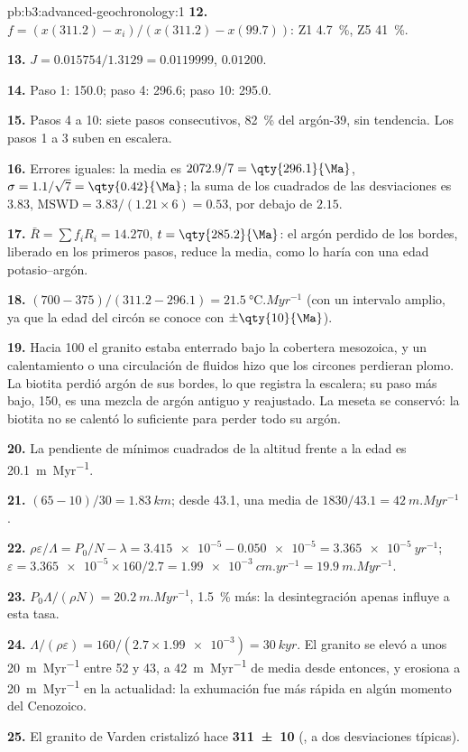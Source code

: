 \begin{solution}{pb:b3:advanced-geochronology:1}
\textbf{12.} $f = (x(311.2) - x_i)/(x(311.2) - x(99.7))$: Z1 \qty{4.7}{\percent},
Z5 \qty{41}{\percent}.

\textbf{13.} $J = 0.015754/1.3129 = 0.0119999$, $0.01200$.

\textbf{14.} Paso 1: \qty{150.0}{\Ma}; paso 4: \qty{296.6}{\Ma}; paso 10:
\qty{295.0}{\Ma}.

\textbf{15.} Pasos 4 a 10: siete pasos consecutivos, \qty{82}{\percent} del
argón-39, sin tendencia. Los pasos 1 a 3 suben en escalera.

\textbf{16.} Errores iguales: la media es $2072.9/7 = \qty{296.1}{\Ma}$, $\sigma =
1.1/\sqrt7 = \qty{0.42}{\Ma}$; la suma de los cuadrados de las desviaciones es $3.83$,
$\mathrm{MSWD} = 3.83/(1.21\times6) = 0.53$, por debajo de $2.15$.

\textbf{17.} $\bar R = \sum f_iR_i = 14.270$, $t = \qty{285.2}{\Ma}$: el
argón perdido de los bordes, liberado en los primeros pasos, reduce la media, como
lo haría con una edad potasio--argón.

\textbf{18.} $(700 - 375)/(311.2 - 296.1) = \qty{21.5}{\celsius.Myr^{-1}}$
(con un intervalo amplio, ya que la edad del circón se conoce con $\pm\qty{10}{\Ma}$).

\textbf{19.} Hacia \qty{100}{\Ma} el granito estaba enterrado bajo la
cobertera mesozoica, y un calentamiento o una circulación de fluidos hizo que los circones perdieran plomo.
La biotita perdió argón de sus bordes, lo que registra la escalera; su
paso más bajo, \qty{150}{\Ma}, es una mezcla de argón antiguo y reajustado. La meseta
se conservó: la biotita no se calentó lo suficiente para perder todo su argón.

\textbf{20.} La pendiente de mínimos cuadrados de la altitud frente a la edad es
\qty{20.1}{m.Myr^{-1}}.

\textbf{21.} $(65 - 10)/30 = \qty{1.83}{km}$; desde \qty{43.1}{\Ma}, una media de
$1830/43.1 = \qty{42}{m.Myr^{-1}}$.

\textbf{22.} $\rho\varepsilon/\Lambda = P_0/N - \lambda = \num{3.415e-5} -
\num{0.050e-5} = \qty{3.365e-5}{yr^{-1}}$; $\varepsilon = \num{3.365e-5}\times
160/2.7 = \qty{1.99e-3}{cm.yr^{-1}} = \qty{19.9}{m.Myr^{-1}}$.

\textbf{23.} $P_0\Lambda/(\rho N) = \qty{20.2}{m.Myr^{-1}}$, \qty{1.5}{\percent}
más: la desintegración apenas influye a esta tasa.

\textbf{24.} $\Lambda/(\rho\varepsilon) = 160/(2.7\times\num{1.99e-3}) =
\qty{30}{kyr}$. El granito se elevó a unos \qty{20}{m.Myr^{-1}} entre 52 y
\qty{43}{\Ma}, a \qty{42}{m.Myr^{-1}} de media desde entonces, y erosiona a
\qty{20}{m.Myr^{-1}} en la actualidad: la exhumación fue más rápida en algún momento del
Cenozoico.

\textbf{25.} El granito de Varden cristalizó hace
\textbf{\qty[text-series-to-math=true, separate-uncertainty=true]{311 \pm 10}{\Ma}} (,
a dos desviaciones típicas).
\end{solution}
